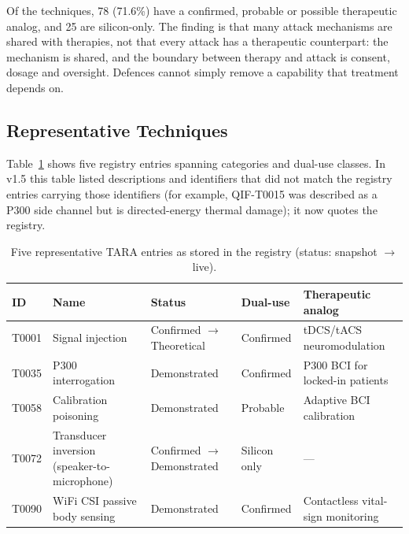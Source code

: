 Of the \SnapshotTechniques{} techniques, 78 (71.6\%) have a confirmed, probable or
possible therapeutic analog, and 25 are silicon-only. The finding is that many attack
mechanisms are shared with therapies, not that every attack has a therapeutic counterpart:
the mechanism is shared, and the boundary between therapy and attack is consent, dosage and
oversight. Defences cannot simply remove a capability that treatment depends on.

\subsection{Representative Techniques}

Table~\ref{tab:representative} shows five registry entries spanning categories and dual-use
classes. In v1.5 this table listed descriptions and identifiers that did not match the
registry entries carrying those identifiers (for example, QIF-T0015 was described as a P300
side channel but is directed-energy thermal damage); it now quotes the registry.

\begin{table}[H]
\centering
\caption{Five representative TARA entries as stored in the registry (status: snapshot
$\to$ live).}
\label{tab:representative}
\small
\begin{tabularx}{\textwidth}{@{}l X l l X@{}}
\toprule
\textbf{ID} & \textbf{Name} & \textbf{Status} & \textbf{Dual-use} & \textbf{Therapeutic analog} \\
\midrule
T0001 & Signal injection & Confirmed $\to$ Theoretical & Confirmed & tDCS/tACS neuromodulation \\
T0035 & P300 interrogation & Demonstrated & Confirmed & P300 BCI for locked-in patients \\
T0058 & Calibration poisoning & Demonstrated & Probable & Adaptive BCI calibration \\
T0072 & Transducer inversion (speaker-to-microphone) & Confirmed $\to$ Demonstrated & Silicon only & --- \\
T0090 & WiFi CSI passive body sensing & Demonstrated & Confirmed & Contactless vital-sign monitoring \\
\bottomrule
\end{tabularx}
\end{table}

